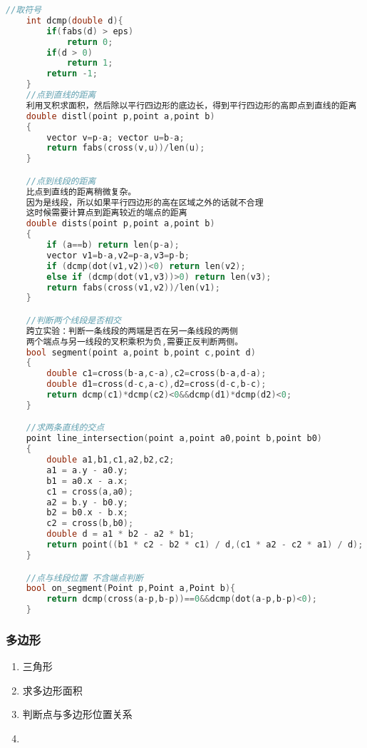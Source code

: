 \documentclass[]{article}
\begin{document}
\begin{lstlisting}[language={c}]
    //取符号
    int dcmp(double d){
        if(fabs(d) > eps)
            return 0;
        if(d > 0)
            return 1;
        return -1;
    }
    //点到直线的距离
    利用叉积求面积，然后除以平行四边形的底边长，得到平行四边形的高即点到直线的距离
    double distl(point p,point a,point b)
    {
    	vector v=p-a; vector u=b-a;
    	return fabs(cross(v,u))/len(u);
    }

    //点到线段的距离
    比点到直线的距离稍微复杂。
    因为是线段，所以如果平行四边形的高在区域之外的话就不合理
    这时候需要计算点到距离较近的端点的距离
    double dists(point p,point a,point b)
    {
	    if (a==b) return len(p-a);
	    vector v1=b-a,v2=p-a,v3=p-b;
	    if (dcmp(dot(v1,v2))<0) return len(v2);
	    else if (dcmp(dot(v1,v3))>0) return len(v3);
	    return fabs(cross(v1,v2))/len(v1);
    }

    //判断两个线段是否相交
    跨立实验：判断一条线段的两端是否在另一条线段的两侧
    两个端点与另一线段的叉积乘积为负,需要正反判断两侧。
    bool segment(point a,point b,point c,point d)
    {
	    double c1=cross(b-a,c-a),c2=cross(b-a,d-a);
	    double d1=cross(d-c,a-c),d2=cross(d-c,b-c);
	    return dcmp(c1)*dcmp(c2)<0&&dcmp(d1)*dcmp(d2)<0;
    }

    //求两条直线的交点
    point line_intersection(point a,point a0,point b,point b0)  
    {  
        double a1,b1,c1,a2,b2,c2;  
        a1 = a.y - a0.y;  
        b1 = a0.x - a.x;  
        c1 = cross(a,a0);  
        a2 = b.y - b0.y;  
        b2 = b0.x - b.x;  
        c2 = cross(b,b0);  
        double d = a1 * b2 - a2 * b1;  
        return point((b1 * c2 - b2 * c1) / d,(c1 * a2 - c2 * a1) / d);  
    }

    //点与线段位置 不含端点判断
    bool on_segment(Point p,Point a,Point b){ 
        return dcmp(cross(a-p,b-p))==0&&dcmp(dot(a-p,b-p)<0); 
    }
\end{lstlisting}

\subsubsection{多边形}
\begin{enumerate}
    \item 三角形
    \item 求多边形面积
    \item 判断点与多边形位置关系
    \item 
\end{enumerate}
\end{document}
